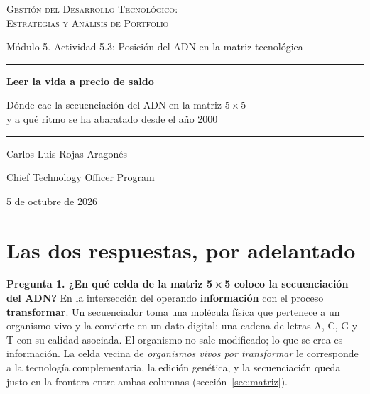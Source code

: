 \documentclass[11pt,letterpaper]{article}
\begin{document}
\begin{titlepage}
\centering
\vspace*{3.2cm}
{\large\scshape Gestión del Desarrollo Tecnológico:\\
Estrategias y Análisis de Portfolio\par}
\vspace{0.5cm}
{\normalsize Módulo 5. Actividad 5.3: Posición del ADN en la matriz tecnológica\par}
\vspace{2.6cm}
{\color{cEje}\rule{0.55\textwidth}{0.8pt}\par}
\vspace{0.7cm}
{\LARGE\bfseries Leer la vida a precio de saldo\par}
\vspace{0.5cm}
{\large Dónde cae la secuenciación del ADN en la matriz 5\,×\,5\\
y a qué ritmo se ha abaratado desde el año 2000\par}
\vspace{0.7cm}
{\color{cEje}\rule{0.55\textwidth}{0.8pt}\par}
\vfill
{\large Carlos Luis Rojas Aragonés\par}
\vspace{0.3cm}
{\normalsize Chief Technology Officer Program\par}
\vspace{0.3cm}
{\normalsize 5 de octubre de 2026\par}
\vspace*{1.5cm}
\end{titlepage}

\section{Las dos respuestas, por adelantado}
\label{sec:respuestas}

\textbf{Pregunta 1. ¿En qué celda de la matriz 5\,×\,5 coloco la secuenciación
del ADN?} En la intersección del operando \textbf{información} con el proceso
\textbf{transformar}. Un secuenciador toma una molécula física que pertenece a
un organismo vivo y la convierte en un dato digital: una cadena de letras A, C,
G y T con su calidad asociada. El organismo no sale modificado; lo que se crea
es información. La celda vecina de \emph{organismos vivos por transformar} le
corresponde a la tecnología complementaria, la edición genética, y la
secuenciación queda justo en la frontera entre ambas columnas
(sección~\ref{sec:matriz}).
\end{document}
